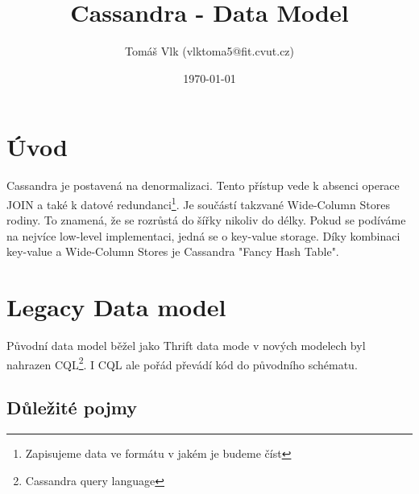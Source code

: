 \documentclass{article}
\title{Cassandra - Data Model\vspace{-1em}}
\author{Tomáš Vlk (vlktoma5@fit.cvut.cz)}
\date{\today}
\begin{document}
\maketitle

\section*{Úvod}

Cassandra je postavená na denormalizaci. Tento přístup vede k absenci operace JOIN a také k datové redundanci\footnote{Zapisujeme data ve formátu v jakém je budeme číst}. Je součástí takzvané Wide-Column Stores rodiny. To znamená, že se rozrůstá do šířky nikoliv do délky. Pokud se podíváme na nejvíce low-level implementaci, jedná se o key-value storage. Díky kombinaci key-value a Wide-Column Stores je Cassandra "Fancy Hash Table". 

\section*{Legacy Data model}

Původní data model běžel jako Thrift data mode v nových modelech byl nahrazen CQL\footnote{Cassandra query language}. I CQL ale pořád převádí kód do původního schématu.

\subsection*{Důležité pojmy}
\end{document}
